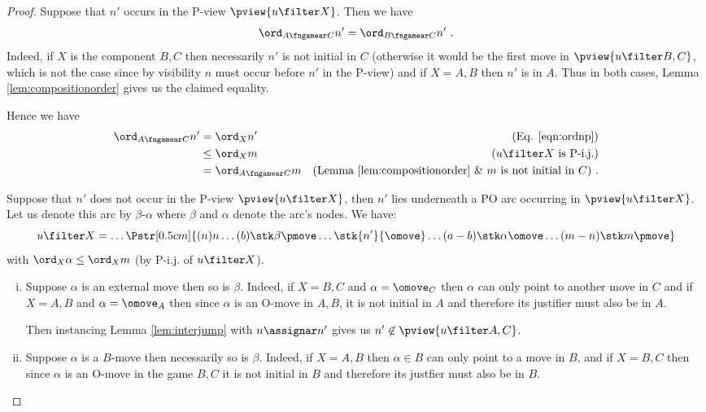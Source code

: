 \begin{proof}

Suppose that $n'$ occurs in the P-view $\pview{u\filter X}$. Then we have
\begin{equation}
\ord_{A\fngamear C} n'  = \ord_{B\fngamear C} n' \ . \label{eqn:ordnp}
\end{equation}
Indeed, if $X$ is the component $B,C$ then necessarily $n'$ is not initial in $C$ (otherwise it would be the first move in $\pview{u \filter B,C}$, which is not the case since by visibility $n$ must occur before $n'$ in the P-view) and
if $X=A,B$ then $n'$ is in $A$. Thus in both cases, Lemma \ref{lem:compositionorder} gives us the claimed equality.

Hence we have
\begin{align*}
\ord_{A\fngamear C} n'
& = \ord_{X} n' & \mbox{(Eq.
\ref{eqn:ordnp})} \\
& \leq \ord_{X} m & \mbox{($u\filter X$ is P-i.j.)} \\
& = \ord_{A\fngamear C} m & \mbox{(Lemma \ref{lem:compositionorder} \& $m$ is not initial in $C$)} \ .
\end{align*}

Suppose that $n'$ does not occur in the P-view $\pview{u \filter X}$, then $n'$ lies underneath a PO arc occurring in $\pview{u \filter X}$. Let us denote this arc by $\beta$-$\alpha$ where $\beta$ and $\alpha$ denote the arc's nodes. We have:
$$ u \filter X = \ldots
\Pstr[0.5cm]{
 (n){n} \ldots (b){\stk\beta \pmove} \ldots \stk{n'} {\omove}
\ldots (a-b){\stk\alpha \omove}  \ldots (m-n){\stk m {\pmove} }
} $$
with $\ord_X \alpha \leq \ord_X m$ (by P-i.j. of $u \filter X$).

\begin{enumerate}[i.]
\item Suppose $\alpha$ is an external move then so is $\beta$. Indeed, if $X=B,C$ and $\alpha = \omove_C$ then $\alpha$ can only point to another move in $C$ and
if $X=A,B$ and $\alpha = \omove_A$ then since $\alpha$ is an O-move in $A,B$, it is not initial in $A$ and therefore its justifier must also be in $A$.

Then instancing Lemma \ref{lem:interjump} with
$n \assignar n'$ gives us $n' \not\in\pview{u \filter A,C}$.

\item Suppose $\alpha$ is a $B$-move then necessarily so is $\beta$. Indeed, if $X=A,B$ then $\alpha \in B$
can only point to a move in $B$, and if $X=B,C$ then
since $\alpha$ is an O-move in the game $B,C$ it is not initial in $B$ and therefore its justfier must also be in $B$.


\end{enumerate}
\end{proof}
